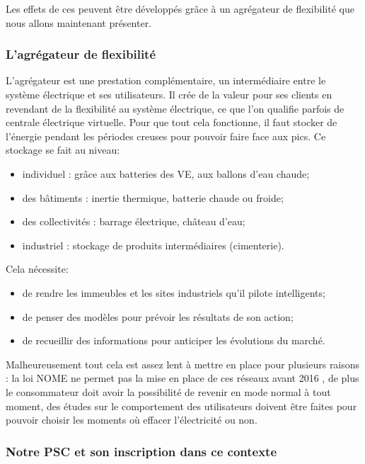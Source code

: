 Les effets de ces \smartgrids{} peuvent être développés grâce à un agrégateur de flexibilité que nous allons maintenant présenter.


\subsubsection{L'agrégateur de flexibilité}

L'agrégateur \cite{agregateur} est une prestation complémentaire, un intermédiaire entre le système électrique et ses utilisateurs. Il crée de la valeur pour ses clients en revendant de la flexibilité au système électrique, ce que l'on qualifie parfois de \og{}centrale électrique virtuelle\fg{}. Pour que tout cela fonctionne, il faut stocker de l'énergie pendant les périodes creuses pour pouvoir faire face aux pics. Ce stockage se fait au niveau:
\begin{itemize}
	\item individuel : grâce aux batteries des VE, aux ballons d'eau chaude;
	\item des bâtiments : inertie thermique, batterie chaude ou froide;
	\item des collectivités : barrage électrique, château d'eau;
	\item industriel : stockage de produits intermédiaires (cimenterie).
\end{itemize}
\bigskip

Cela nécessite:
\begin{itemize}
	\item de rendre les immeubles et les sites industriels qu'il pilote \og{}intelligents\fg{};
	\item de penser des modèles pour prévoir les résultats de son action;
	\item de recueillir des informations pour anticiper les évolutions du marché.
\end{itemize}
\bigskip

Malheureusement tout cela est assez lent à mettre en place pour plusieurs raisons : la loi NOME ne permet pas la mise en place de ces réseaux avant 2016 \cite{loiNome}, de plus le consommateur doit avoir la possibilité de revenir en mode \og{}normal\fg{} à tout moment, des études sur le comportement des utilisateurs doivent être faites pour pouvoir choisir les moments où effacer l'électricité ou non.

\subsubsection{Notre PSC et son inscription dans ce contexte}


